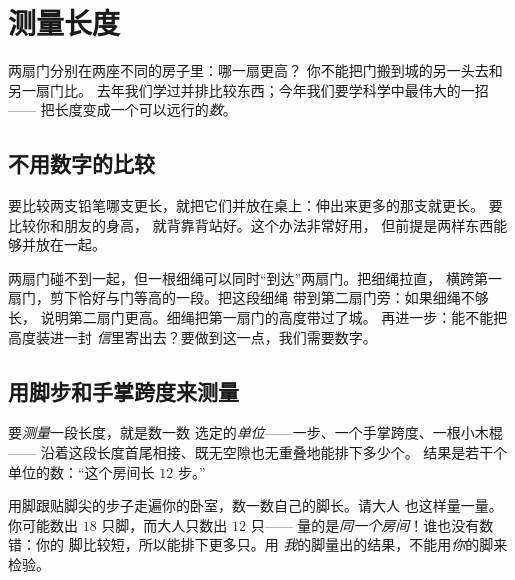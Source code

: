 \chapter{测量长度}\label{ch:g2:measuring-length}

两扇门分别在两座不同的房子里：哪一扇更高？
你不能把门搬到城的另一头去和另一扇门比。
去年我们学过并排比较东西；今年我们要学科学中最伟大的一招——
把长度变成一个可以远行的\emph{数}。

\section{不用数字的比较}

\begin{example}[并排比较]\label{ex:g2:measuring-length:sidebyside}
要比较两支铅笔哪支更长，就把它们并放在桌上：伸出来更多的那支就更长。
要比较你和朋友的身高，
就背靠背站好。这个办法非常好用，
但前提是两样东西能够并放在一起。
\end{example}

\begin{example}[细绳的办法]\label{ex:g2:measuring-length:string}
两扇门碰不到一起，但一根细绳可以同时“到达”两扇门。把细绳拉直，
横跨第一扇门，剪下恰好与门等高的一段。把这段细绳
带到第二扇门旁：如果细绳不够长，
说明第二扇门更高。细绳把第一扇门的高度带过了城。
再进一步：能不能把高度装进一封
\emph{信}里寄出去？要做到这一点，我们需要数字。
\end{example}

\section{用脚步和手掌跨度来测量}

\begin{definition}[测量长度]\label{def:g2:measuring-length:measure}
要\emph{测量}一段长度，就是数一数
选定的\emph{单位}——一步、一个手掌跨度、一根小木棍——
沿着这段长度首尾相接、既无空隙也无重叠地能排下多少个。
结果是若干个单位的数：“这个房间长 $12$ 步。”
\end{definition}

\begin{example}\label{ex:g2:measuring-length:pace}
用脚跟贴脚尖的步子走遍你的卧室，数一数自己的脚长。请大人
也这样量一量。你可能数出 $18$ 只脚，而大人只数出 $12$ 只——
量的是\emph{同一个房间}！谁也没有数错：你的
脚比较短，所以能排下更多只。用
\emph{我}的脚量出的结果，不能用\emph{你}的脚来检验。
\end{example}

